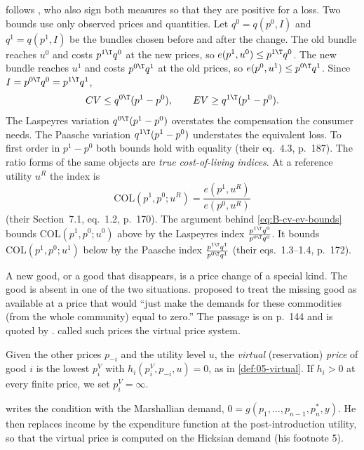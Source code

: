  follows \citet[Section~7.4, eqs.~4.1--4.2, p.~186]{DeatonMuellbauer1980b}, who also
sign both measures so that they are positive for a loss. Two bounds use only observed prices and
quantities. Let $q^0 = q(p^0, I)$ and $q^1 = q(p^1, I)$ be the bundles chosen before and after the change.
The old bundle reaches $u^0$ and costs $p^{1\T}q^0$ at the new prices, so $e(p^1, u^0) \leq p^{1\T}q^0$. The
new bundle reaches $u^1$ and costs $p^{0\T}q^1$ at the old prices, so $e(p^0, u^1) \leq p^{0\T}q^1$. Since
$I = p^{0\T}q^0 = p^{1\T}q^1$,
\begin{equation}\label{eq:B-cv-ev-bounds}
CV \leq q^{0\T}(p^1 - p^0), \qquad EV \geq q^{1\T}(p^1 - p^0).
\end{equation}
The Laspeyres variation $q^{0\T}(p^1 - p^0)$ overstates the compensation the consumer needs. The Paasche
variation $q^{1\T}(p^1 - p^0)$ understates the equivalent loss. To first order in $p^1 - p^0$ both bounds hold with equality
(their eq.~4.3, p.~187). The ratio forms of the same objects are \emph{true cost-of-living indices}. At a
reference utility $u^R$ the index is
\begin{equation*}
\mathrm{COL}(p^1, p^0; u^R) = \frac{e(p^1, u^R)}{e(p^0, u^R)}
\end{equation*}
(their Section~7.1, eq.~1.2, p.~170). The argument behind \eqref{eq:B-cv-ev-bounds} bounds
$\mathrm{COL}(p^1, p^0; u^0)$ above by the Laspeyres index $\frac{p^{1\T}q^0}{p^{0\T}q^0}$. It bounds
$\mathrm{COL}(p^1, p^0; u^1)$ below by the Paasche index $\frac{p^{1\T}q^1}{p^{0\T}q^1}$ (their eqs.~1.3--1.4,
p.~172).

A new good, or a good that disappears, is a price change of a special kind. The good is absent in one
of the two situations. \citet{Hicks1940} proposed to treat the missing good as available at a price
that would ``just make the demands for these commodities (from the whole community) equal to zero.''
The passage is on p.~144 and is quoted by \citet[p.~211]{Hausman1997}. \citet{Rothbarth1941} called such prices the virtual price
system.

\begin{definition}\label{def:B-virtual}
Given the other prices $p_{-i}$ and the utility level $u$, the \emph{virtual} (reservation) \emph{price} of
good $i$ is the lowest $p_i^V$ with $h_i(p_i^V, p_{-i}, u) = 0$, as in \cref{def:05-virtual}. If $h_i > 0$ at
every finite price, we set $p_i^V = \infty$.
\end{definition}

\citet[eqs.~1--2, p.~211]{Hausman1997} writes the condition with the Marshallian demand,
$0 = g(p_1, \dots, p_{n-1}, p_n^*, y)$. He then replaces income by the expenditure function at the
post-introduction utility, so that the virtual price is computed on the Hicksian demand (his footnote 5).

